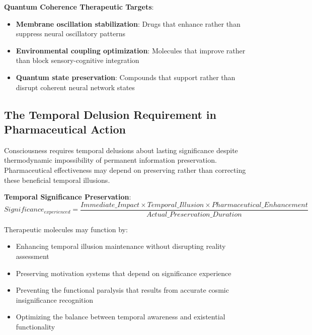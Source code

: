 \documentclass[12pt,a4paper]{article}
\begin{document}
\textbf{Quantum Coherence Therapeutic Targets}:
\begin{itemize}
\item \textbf{Membrane oscillation stabilization}: Drugs that enhance rather than suppress neural oscillatory patterns
\item \textbf{Environmental coupling optimization}: Molecules that improve rather than block sensory-cognitive integration
\item \textbf{Quantum state preservation}: Compounds that support rather than disrupt coherent neural network states
\end{itemize}

\subsection{The Temporal Delusion Requirement in Pharmaceutical Action}

Consciousness requires temporal delusions about lasting significance despite thermodynamic impossibility of permanent information preservation. Pharmaceutical effectiveness may depend on preserving rather than correcting these beneficial temporal illusions.

\textbf{Temporal Significance Preservation}:
$$Significance_{experienced} = \frac{Immediate\_Impact \times Temporal\_Illusion \times Pharmaceutical\_Enhancement}{Actual\_Preservation\_Duration}$$

Therapeutic molecules may function by:
\begin{itemize}
\item Enhancing temporal illusion maintenance without disrupting reality assessment
\item Preserving motivation systems that depend on significance experience
\item Preventing the functional paralysis that results from accurate cosmic insignificance recognition
\item Optimizing the balance between temporal awareness and existential functionality
\end{itemize}

\section{Implications for Drug Discovery and Development}

\subsection{Pharmaceutical Design Optimization}
\end{document}

